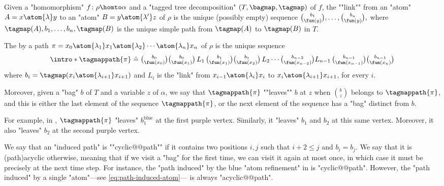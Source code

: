 \begin{definition}
	\AP\label{def:path-induced}
	Given a "homomorphism" $f\colon \rho \homto \alpha$ and a "tagged tree decomposition"
	$(T, \bagmap, \tagmap)$ of $f$,
    the \AP""link"" from an "atom" $A = x \atom{\lambda} y$ to an "atom" $B= y \atom{\lambda'} z$ of $\rho$ is the unique (possibly empty) sequence
    $
            \textstyle{
                {b_{1} \choose \fun(y)}, \hdots,
                {b_{n} \choose \fun(y)},
            }
    $
    where $\tagmap(A), b_{1}, \dotsc, b_n, \tagmap(B)$ is the unique simple path from $\tagmap(A)$ to $\tagmap(B)$ in $T$.

    \AP The  by a path
	$
		\pi = 
		x_0 \atom{\lambda_1} x_1 \atom{\lambda_2} \cdots \atom{\lambda_n} x_n
	$
	of $\rho$ is the unique sequence
    \[
		\intro*\tagmappath{\pi} \defeq
            \textstyle{
                {b_0 \choose \fun(x_0)} {b_0 \choose \fun(x_1)} \,
                L_1 \,
                {b_1 \choose \fun(x_1)} {b_1 \choose \fun(x_2)} \,
                L_2 
                \dotsb 
				{b_{n-2} \choose \fun(x_{n-2})}
                L_{n-1} \,
                {b_{n-1} \choose \fun(x_{n-1})} {b_{n-1} \choose \fun(x_n)}
            }
    \]
    where $b_i = \tagmap(x_i \atom{\lambda_{i+1}} x_{i+1})$ and $L_i$ is the "link" from $x_{i-1} \atom{\lambda_i} x_i$ to $x_{i} \atom{\lambda_{i+1}} x_{i+1}$, for every $i$.
\end{definition}

\AP Moreover, given a "bag" $b$ of $T$ and a variable $z$ of $\alpha$, we say that
$\tagmappath{\pi}$ ""leaves"" $b$ at $z$ when ${b \choose z}$ belongs to
$\tagmappath{\pi}$, and this is either the last element of the sequence $\tagmappath{\pi}$,
or the next element of the sequence has a "bag" distinct from $b$.

For example, in ,
$\tagmappath{\pi}$ "leaves" $b^{\text{blue}}_1$ at the first purple vertex.
Similarly, it "leaves" $b_1$ and $b_2$ at this same vertex. Moreover,
it also "leaves" $b_2$ at the second purple vertex.

We say that an "induced path" is \AP""cyclic@@path"" if it contains two positions $i, j$
such that $i+2 \leq j$ and $b_i = b_{j}$.
We say that it is \reintro(path){acyclic} otherwise,
meaning that if we visit a "bag" for the first time, we can visit it again at
most once, in which case it must be precisely at the next time step.
For instance, the "path induced" by the blue "atom refinement" in 
is "cyclic@@path". However, the "path induced" by a single
"atom"---see \eqref{eq:path-induced-atom}--- is always "acyclic@@path".


